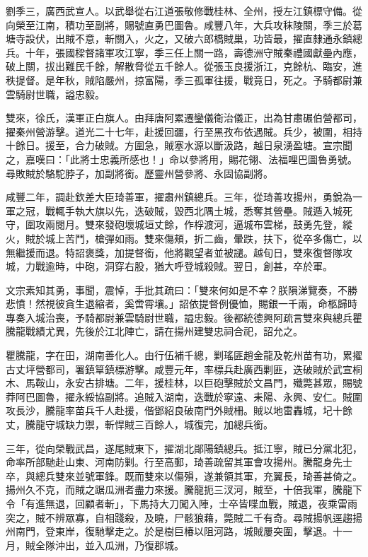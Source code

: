 \begin{pinyinscope}
劉季三，廣西武宣人。以武舉從右江道張敬修戰桂林、全州，授左江鎮標守備。從向榮至江南，積功至副將，賜號直勇巴圖魯。咸豐八年，大兵攻秣陵關，季三於葛塘寺設伏，出賊不意，斬關入，火之，又破六郎橋賊巢，功皆最，擢直隸通永鎮總兵。十年，張國樑督諸軍攻江寧，季三任上關一路，壽德洲守賊秦禮國獻壘內應，破上關，拔出難民千餘，解散脅從五千餘人。從張玉良援浙江，克餘杭、臨安，進秩提督。是年秋，賊陷嚴州，掠富陽，季三孤軍往援，戰竟日，死之。予騎都尉兼雲騎尉世職，謚忠毅。

雙來，徐氏，漢軍正白旗人。由拜唐阿累遷鑾儀衛治儀正，出為甘肅碾伯營都司，擢秦州營游擊。道光二十七年，赴援回疆，行至黑孜布依遇賊。兵少，被圍，相持十餘日。援至，合力破賊。方圍急，賊塞水源以斷汲路，越日泉湧盈塘。宣宗聞之，嘉嘆曰：「此將士忠義所感也！」命以參將用，賜花翎、法福哩巴圖魯勇號。尋敗賊於駱駝脖子，加副將銜。歷靈州營參將、永固協副將。

咸豐二年，調赴欽差大臣琦善軍，擢肅州鎮總兵。三年，從琦善攻揚州，勇銳為一軍之冠，戰輒手執大旗以先，迭破賊，毀西北隅土城，悉奪其營壘。賊遁入城死守，圍攻兩閱月。雙來發砲壞城垣丈餘，作桴渡河，逼城布雲梯，鼓勇先登，縱火，賊於城上苦鬥，槍彈如雨。雙來傷頰，折二齒，暈跌，扶下，從卒多傷亡，以無繼援而退。特詔褒獎，加提督銜，他將觀望者並被譴。越旬日，雙來復督隊攻城，力戰逾時，中砲，洞穿右股，猶大呼登城殺賊。翌日，創甚，卒於軍。

文宗素知其勇，事聞，震悼，手批其疏曰：「雙來何如是不幸？朕隕涕覽奏，不勝悲憤！然視彼貪生退縮者，奚啻霄壤。」詔依提督例優恤，賜銀一千兩，命柩歸時專奏入城治喪，予騎都尉兼雲騎尉世職，謚忠毅。後都統德興阿疏言雙來與總兵瞿騰龍戰績尤異，先後於江北陣亡，請在揚州建雙忠祠合祀，詔允之。

瞿騰龍，字在田，湖南善化人。由行伍補千總，剿瑤匪趙金龍及乾州苗有功，累擢古丈坪營都司，署鎮筸鎮標游擊。咸豐元年，率標兵赴廣西剿匪，迭破賊於武宣桐木、馬鞍山，永安古排塘。二年，援桂林，以巨砲擊賊於文昌門，殲斃甚眾，賜號莽阿巴圖魯，擢永綏協副將。追賊入湖南，迭戰於寧遠、耒陽、永興、安仁。賊圍攻長沙，騰龍率苗兵千人赴援，偕鄧紹良破南門外賊柵。賊以地雷轟城，圮十餘丈，騰龍守城缺力禦，斬悍賊三百餘人，城復完，加總兵銜。

三年，從向榮戰武昌，遂尾賊東下，擢湖北鄖陽鎮總兵。抵江寧，賊已分黨北犯，命率所部馳赴山東、河南防剿。行至高郵，琦善疏留其軍會攻揚州。騰龍身先士卒，與總兵雙來並號軍鋒。既而雙來以傷殞，遂兼領其軍，充翼長，琦善甚倚之。揚州久不克，而賊之踞瓜洲者盡力來援。騰龍扼三汊河，賊至，十倍我軍，騰龍下令「有進無退，回顧者斬」，下馬持大刀闖入陣，士卒皆喋血戰，賊退，夜乘雷雨突之，賊不辨眾寡，自相踐殺，及曉，尸骸狼藉，斃賊二千有奇。尋賊揚帆逕趨揚州南門，登東岸，復馳擊走之。於是樹巨椿以阻河路，城賊屢突圍，擊退。十一月，賊全隊沖出，並入瓜洲，乃復郡城。


\end{pinyinscope}
